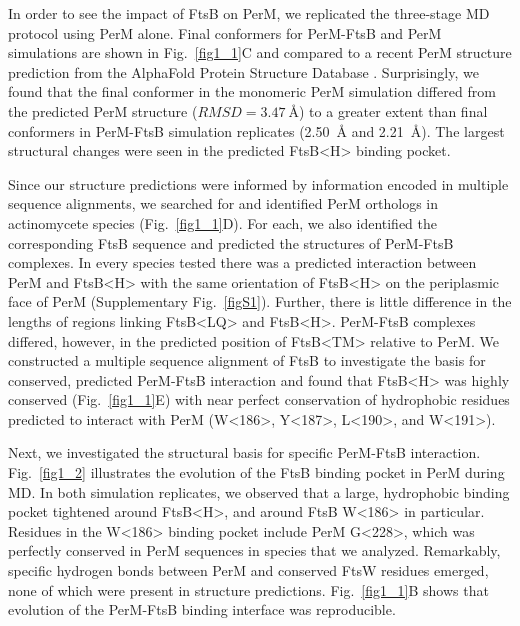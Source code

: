 \documentclass[twocolumn,pdflatex,sn-nature]{sn-jnl}%
\def\textsuperscript#1{<#1>}%
\newcommand\ftsbTM{FtsB\textsuperscript{TM}}
\newcommand\ftsbLQ{FtsB\textsuperscript{LQ}}
\newcommand\ftsbH{FtsB\textsuperscript{H}}
\begin{document}
In order to see the impact of FtsB on PerM, we replicated the three-stage MD protocol using PerM alone.
Final conformers for PerM-FtsB and PerM simulations are shown in Fig.~\ref{fig1_1}C and compared to a recent PerM structure prediction from the AlphaFold Protein Structure Database \citep{varadiAlphaFoldProteinStructure2022}.
Surprisingly, we found that the final conformer in the monomeric PerM simulation differed from the predicted PerM structure ($RMSD=\qty{3.47}{\angstrom}$) to a greater extent than final conformers in PerM-FtsB simulation replicates (\qty{2.50}{\angstrom} and \qty{2.21}{\angstrom}).
The largest structural changes were seen in the predicted \ftsbH{} binding pocket.

Since our structure predictions were informed by information encoded in multiple sequence alignments, we searched for and identified PerM orthologs in actinomycete species (Fig.~\ref{fig1_1}D).
For each, we also identified the corresponding FtsB sequence and predicted the structures of PerM-FtsB complexes.
In every species tested there was a predicted interaction between PerM and \ftsbH{} with the same orientation of \ftsbH{} on the periplasmic face of PerM (Supplementary Fig.~\ref{figS1}).
Further, there is little difference in the lengths of regions linking \ftsbLQ{} and \ftsbH{}.
PerM-FtsB complexes differed, however, in the predicted position of \ftsbTM{} relative to PerM.
We constructed a multiple sequence alignment of FtsB to investigate the basis for conserved, predicted PerM-FtsB interaction and found that \ftsbH{} was highly conserved (Fig.~\ref{fig1_1}E) with near perfect conservation of hydrophobic residues predicted to interact with PerM (W\textsuperscript{186}, Y\textsuperscript{187}, L\textsuperscript{190}, and W\textsuperscript{191}).

Next, we investigated the structural basis for specific PerM-FtsB interaction. Fig.~\ref{fig1_2} illustrates the evolution of the FtsB binding pocket in PerM during MD.
In both simulation replicates, we observed that a large, hydrophobic binding pocket tightened around \ftsbH{}, and around FtsB W\textsuperscript{186} in particular. 
Residues in the W\textsuperscript{186} binding pocket include PerM G\textsuperscript{228}, which was perfectly conserved in PerM sequences in species that we analyzed.
Remarkably, specific hydrogen bonds between PerM and conserved FtsW residues emerged, none of which were present in structure predictions.
Fig.~\ref{fig1_1}B shows that evolution of the PerM-FtsB binding interface was reproducible.
\end{document}
